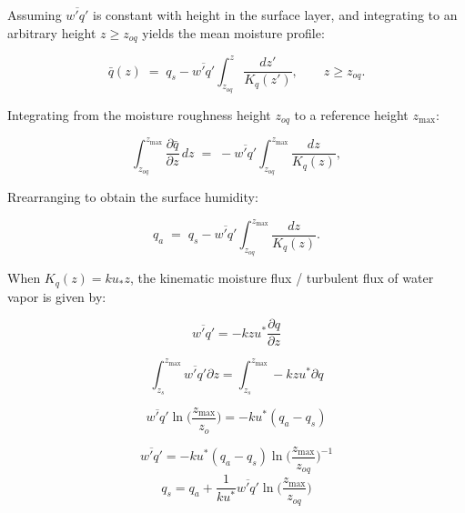 \documentclass{article}
\begin{document}
    Assuming $\overline{w'q'}$ is constant with height in the surface layer, and integrating to an arbitrary height $z\ge z_{oq}$ yields the mean moisture profile:

    \begin{equation}
    \bar q(z)
    \;=\;
    q_s
    -\overline{w'q'}\int_{z_{oq}}^{z}\frac{dz'}{K_q(z')},
    \qquad z\ge z_{oq}.
    \label{eq:q_profile_general}
    \end{equation}

    Integrating from the moisture roughness height $z_{oq}$ to a reference height $z_{\max}$:

    \begin{equation}
    \int_{z_{oq}}^{z_{\max}}\frac{\partial \bar q}{\partial z}\,dz
    \;=\;
    -\overline{w'q'}\int_{z_{oq}}^{z_{\max}}\frac{dz}{K_q(z)},
    \end{equation}

      Rrearranging to obtain the surface humidity: 

    \begin{equation}
    q_a \;=\;  q_s
    -\overline{w'q'}\int_{z_{oq}}^{z_{\max}}\frac{dz}{K_q(z)}.
    \label{eq:qa_minus_qs_general}
    \end{equation}

    When $K_q(z)=ku_*z$, the kinematic moisture flux / turbulent flux of water vapor is given by:

     \begin{equation}
         \overline{w'q'} = -kzu^* \frac{\partial q}{\partial z}
     \end{equation}

    \begin{equation}
         \int_{z_{s}}^{z_{\max}}\overline{w'q'} \partial z = 
         \int_{z_{s}}^{z_{\max}} -kzu^* \partial q
     \end{equation}

    \begin{equation}
         \overline{w'q'} \ln  \bigg(\frac{z_{\max}}{z_o}\bigg) = 
         -k u^* (q_a - q_s)
     \end{equation}

    \begin{equation}
         \overline{w'q'}  = 
         -k u^* (q_a - q_s)  \ln  \bigg(\frac{z_{\max}}{z_{oq}}\bigg)^{-1}
     \end{equation}  
    \begin{equation}
        q_s = q_a + \frac{1}{ ku^* } \overline{w'q'} \ln  \bigg(\frac{z_{\max}}{z_{oq}}\bigg) 
     \end{equation}
\end{document}
